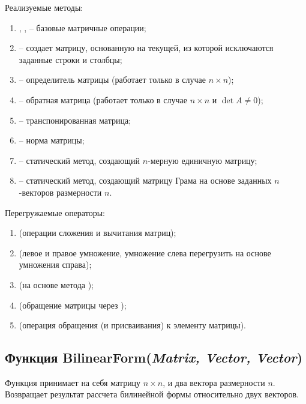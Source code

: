 	\noindent Реализуемые методы:
	\begin{enumerate}
		\item {}, , \newline {} -- базовые матричные операции;
		\item {} -- создает матрицу, основанную на текущей, из которой исключаются заданные строки и столбцы;
		\item {} -- определитель матрицы (работает только в случае \(n \times n\));
		\item {} -- обратная матрица (работает только в случае \(n \times n\) и \( \det{A} \neq 0 \));
		\item {} -- транспонированная матрица;
		\item {} -- норма матрицы;
		\item {} -- статический метод, создающий $n$-мерную единичную матрицу;
		\item {} -- статический метод, создающий матрицу Грама на основе заданных $n$-векторов размерности $n$.
	\end{enumerate}

	\noindent Перегружаемые операторы:
	\begin{enumerate}
		\item {} (операции сложения и вычитания матриц);
		\item {} (левое и правое умножение, умножение слева перегрузить на основе умножения справа);
		\item {} (на основе метода );
		\item {} (обращение матрицы через );
		\item {} (операция обращения (и присваивания) к элементу матрицы).
	\end{enumerate}

\subsection{Функция BilinearForm(\textit{Matrix, Vector, Vector})}
	\noindent Функция принимает на себя матрицу $n \times n$, и два вектора размерности $n$. Возвращает результат рассчета билинейной формы относительно двух векторов.

